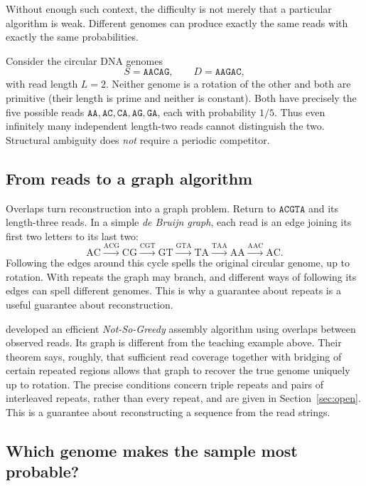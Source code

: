 Without enough such context, the difficulty is not merely that a
particular algorithm is weak. Different genomes can produce exactly
the same reads with exactly the same probabilities.

\begin{example}
\label{ex:ABAB}
Consider the circular DNA genomes
\[
  S=\texttt{AACAG},\qquad D=\texttt{AAGAC},
\]
with read length $L=2$. Neither genome is a rotation of the other and
both are primitive (their length is prime and neither is constant).
Both have precisely the five possible reads
$\texttt{AA},\texttt{AC},\texttt{CA},\texttt{AG},\texttt{GA}$,
each with probability $1/5$. Thus even infinitely many independent
length-two reads cannot distinguish the two. Structural ambiguity
does \emph{not} require a periodic competitor.
\end{example}

\subsection{From reads to a graph algorithm}
\label{sec:intro:assembly-operations}

Overlaps turn reconstruction into a graph problem. Return to
$\texttt{ACGTA}$ and its length-three reads. In a simple
\emph{de Bruijn graph}, each read is an edge joining its first two
letters to its last two:
\[
\mathrm{AC}\xrightarrow{\mathrm{ACG}}\mathrm{CG}
\xrightarrow{\mathrm{CGT}}\mathrm{GT}
\xrightarrow{\mathrm{GTA}}\mathrm{TA}
\xrightarrow{\mathrm{TAA}}\mathrm{AA}
\xrightarrow{\mathrm{AAC}}\mathrm{AC}.
\]
Following the edges around this cycle spells the original circular
genome, up to rotation. With repeats the graph may branch, and
different ways of following its edges can spell different genomes.
This is why a guarantee about repeats is a useful guarantee about
reconstruction.

\textcite{shomorony2016} developed an efficient
\emph{Not-So-Greedy} assembly algorithm using overlaps between observed
reads. Its graph is different from the teaching example above. Their
theorem says, roughly, that sufficient read coverage together with
bridging of certain repeated regions allows that graph to recover the
true genome uniquely up to rotation. The precise conditions concern
triple repeats and pairs of interleaved repeats, rather than every
repeat, and are given in Section~\ref{sec:open}. This is a guarantee
about reconstructing a sequence from the read strings.

\subsection{Which genome makes the sample most probable?}

